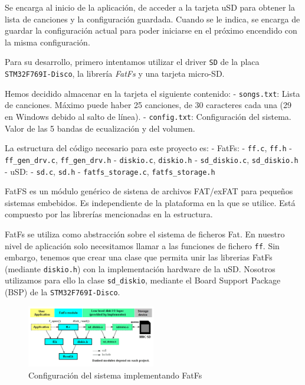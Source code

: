 Se encarga al inicio de la aplicación, de acceder a la tarjeta uSD para obtener la lista de canciones y la configuración guardada. Cuando se le indica, se encarga de guardar la configuración actual para poder iniciarse en el próximo encendido con la misma configuración. 

Para su desarrollo, primero intentamos utilizar el driver \texttt{SD} de la placa \texttt{STM32F769I-Disco}, la librería \textit{FatFs} \cite{FatFsModuleApplication}\cite{FatFsGenericFAT} y una tarjeta micro-SD.

Hemos decidido almacenar en la tarjeta el siguiente contenido:
- \texttt{songs.txt}: Lista de canciones. Máximo puede haber 25 canciones, de 30 caracteres cada una (29 en Windows debido al salto de línea). 
- \texttt{config.txt}: Configuración del sistema. Valor de las 5 bandas de ecualización y del volumen.


La estructura del código necesario para este proyecto es:
- FatFs:
	- \texttt{ff.c}, \texttt{ff.h}
	- \texttt{ff_gen_drv.c}, \texttt{ff_gen_drv.h}
	- \texttt{diskio.c}, \texttt{diskio.h}
	- \texttt{sd_diskio.c}, \texttt{sd_diskio.h}
- uSD:
	- \texttt{sd.c}, \texttt{sd.h}
	- \texttt{fatfs_storage.c}, \texttt{fatfs_storage.h}

FatFS es un módulo genérico de sistena de archivos FAT/exFAT para pequeños sistemas embebidos. Es independiente de la plataforma en la que se utilice. Está compuesto por las librerías mencionadas en la estructura.

FatFs se utiliza como abstracción sobre el sistema de ficheros Fat. En nuestro nivel de aplicación solo necesitamos llamar a las funciones de fichero \texttt{ff}. Sin embargo, tenemos que crear una clase que permita unir las librerias FatFs (mediante \texttt{diskio.h}) con la implementación hardware de la uSD. Nosotros utilizamos para ello la clase \texttt{sd_diskio}, mediante el Board Support Package (BSP) de la \texttt{STM32F769I-Disco}.

\begin{figure}[h]
    \centering
    \includegraphics[width=0.5\textwidth]{images/3/3-2/SD/FatFs_1.png}
    \caption{Configuración del sistema implementando FatFs}
    \label{fig:sistema-fatfs}
\end{figure}

